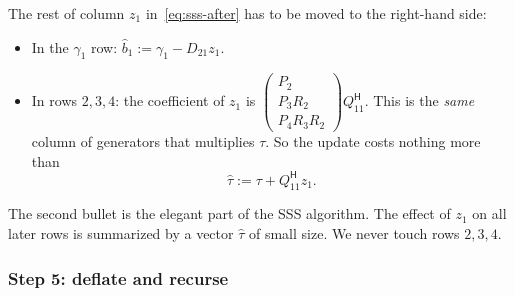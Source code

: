 \documentclass[11pt]{article}
\newcommand{\ct}{^{\mathsf H}}            %
\newcommand{\hb}{\hat b}
\newcommand{\htau}{\hat\tau}
\theoremstyle{definition}
\begin{document}
The rest of column $z_1$ in~\eqref{eq:sss-after} has to be moved to the right-hand side:
\begin{itemize}
  \item In the $\gamma_1$ row: $\hb_1 := \gamma_1 - D_{21}z_1$.
  \item In rows $2,3,4$: the coefficient of $z_1$ is
    $\left(\begin{smallmatrix}P_2\\P_3R_2\\P_4R_3R_2\end{smallmatrix}\right)Q_{11}\ct$.
    This is the \emph{same} column of generators that multiplies $\tau$. So the update costs
    nothing more than
    \[
    \htau := \tau + Q_{11}\ct z_1 .
    \]
\end{itemize}
The second bullet is the elegant part of the SSS algorithm. The effect of $z_1$ on all
later rows is summarized by a vector $\htau$ of small size. We never touch rows $2,3,4$.

\subsubsection*{Step 5: deflate and recurse}
\end{document}
